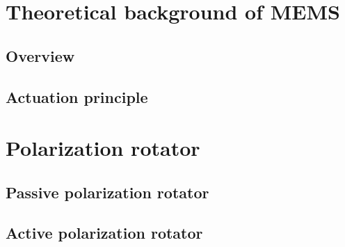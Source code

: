 \documentclass[../report.tex]{subfiles}
\begin{document}
	\section{Theoretical background of MEMS}
	
		\subsection{Overview}
		
		\subsection{Actuation principle}
			
	\section{Polarization rotator}
	
		\subsection{Passive polarization rotator}
	
		\subsection{Active polarization rotator}
\end{document}
